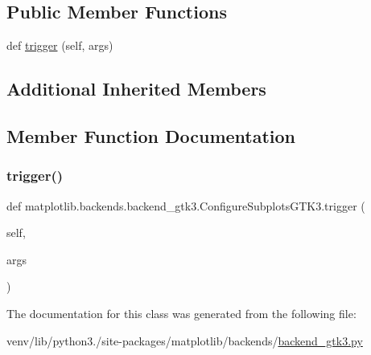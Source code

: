 \subsection*{Public Member Functions}
\begin{DoxyCompactItemize}
\item 
def \hyperlink{classmatplotlib_1_1backends_1_1backend__gtk3_1_1ConfigureSubplotsGTK3_a4a0a22b2cc7ddeb7f00bdbad95111a1c}{trigger} (self, args)
\end{DoxyCompactItemize}
\subsection*{Additional Inherited Members}


\subsection{Member Function Documentation}
\mbox{\label{classmatplotlib_1_1backends_1_1backend__gtk3_1_1ConfigureSubplotsGTK3_a4a0a22b2cc7ddeb7f00bdbad95111a1c}} 
\subsubsection{\texorpdfstring{trigger()}{trigger()}}
{\footnotesize\ttfamily def matplotlib.\+backends.\+backend\+\_\+gtk3.\+Configure\+Subplots\+G\+T\+K3.\+trigger (\begin{DoxyParamCaption}\item[{}]{self,  }\item[{}]{args }\end{DoxyParamCaption})}



The documentation for this class was generated from the following file\+:\begin{DoxyCompactItemize}
\item 
venv/lib/python3./site-\/packages/matplotlib/backends/\hyperlink{backend__gtk3_8py}{backend\+\_\+gtk3.\+py}\end{DoxyCompactItemize}
